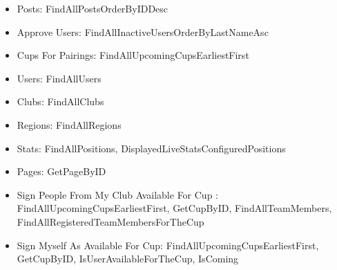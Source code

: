 \begin{itemize}
    \item Posts: FindAllPostsOrderByIDDesc
    \item Approve Users: FindAllInactiveUsersOrderByLastNameAsc
    \item Cups For Pairings: FindAllUpcomingCupsEarliestFirst
    \item Users: FindAllUsers
    \item Clubs: FindAllClubs
    \item Regions: FindAllRegions
    \item Stats: FindAllPositions, DisplayedLiveStatsConfiguredPositions
    \item Pages: GetPageByID
    \item Sign People From My Club Available For Cup : FindAllUpcomingCupsEarliestFirst, GetCupByID, FindAllTeamMembers, FindAllRegisteredTeamMembersForTheCup
    \item Sign Myself As Available For Cup: FindAllUpcomingCupsEarliestFirst, GetCupByID, IsUserAvailableForTheCup, IsComing
\end{itemize}
\fi